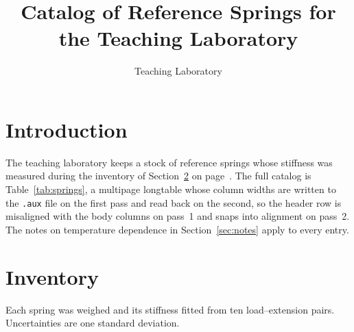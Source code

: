 \documentclass[11pt]{article}
\title{Catalog of Reference Springs for the Teaching Laboratory}
\author{Teaching Laboratory}
\date{}
\begin{document}
\maketitle

\section{Introduction}
\label{sec:intro}

The teaching laboratory keeps a stock of reference springs whose stiffness
was measured during the inventory of Section~\ref{sec:inventory} on
page~\pageref{sec:inventory}. The full catalog is Table~\ref{tab:springs},
a multipage \textsf{longtable} whose column widths are written to the
\texttt{.aux} file on the first pass and read back on the second, so the
header row is misaligned with the body columns on pass~1 and snaps into
alignment on pass~2. The notes on
temperature dependence in Section~\ref{sec:notes} apply to every entry.

\section{Inventory}
\label{sec:inventory}

Each spring was weighed and its stiffness fitted from ten load--extension
pairs. Uncertainties are one standard deviation.
\end{document}
